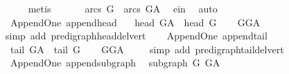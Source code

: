 \begin{isabellebody}
\ \ \ \ \isamarkupfalse%
\ metis\ \isanewline
\ \ \isamarkupfalse%
\ \isamarkupfalse%
\ {\isachardoublequoteopen}arcs\ G\ {\isasymnoteq}\ arcs\ G{\isacharunderscore}{\kern0pt}A{\isachardoublequoteclose}\ \isamarkupfalse%
\ e{\isacharunderscore}{\kern0pt}in\ \isamarkupfalse%
\ auto\isanewline
{}\isamarkupfalse%
%
\endisatagproof
{\isafoldproof}%
%
\isadelimproof
\isanewline
%
\endisadelimproof
\ \ \isanewline
{}\isamarkupfalse%
\ {\isacharparenleft}{\kern0pt}\ Append{\isacharunderscore}{\kern0pt}One{\isacharparenright}{\kern0pt}\ append{\isacharunderscore}{\kern0pt}head{\isacharcolon}{\kern0pt}\ \isanewline
\ \ {\isachardoublequoteopen}head\ G{\isacharunderscore}{\kern0pt}A\ {\isacharequal}{\kern0pt}\ head\ G{\isachardoublequoteclose}\isanewline
%
\isadelimproof
\ \ %
\endisadelimproof
%
\isatagproof
{}\isamarkupfalse%
\ GG{\isacharunderscore}{\kern0pt}A\ \isanewline
\ \ \isamarkupfalse%
\ {\isacharparenleft}{\kern0pt}simp\ add{\isacharcolon}{\kern0pt}\ pre{\isacharunderscore}{\kern0pt}digraph{\isachardot}{\kern0pt}head{\isacharunderscore}{\kern0pt}del{\isacharunderscore}{\kern0pt}vert{\isacharparenright}{\kern0pt}%
\endisatagproof
{\isafoldproof}%
%
\isadelimproof
\ \isanewline
%
\endisadelimproof
\isanewline
{}\isamarkupfalse%
\ {\isacharparenleft}{\kern0pt}\ Append{\isacharunderscore}{\kern0pt}One{\isacharparenright}{\kern0pt}\ append{\isacharunderscore}{\kern0pt}tail{\isacharcolon}{\kern0pt}\ \isanewline
\ \ {\isachardoublequoteopen}tail\ G{\isacharunderscore}{\kern0pt}A\ {\isacharequal}{\kern0pt}\ tail\ G{\isachardoublequoteclose}\isanewline
%
\isadelimproof
\ \ %
\endisadelimproof
%
\isatagproof
{}\isamarkupfalse%
\ GG{\isacharunderscore}{\kern0pt}A\ \isanewline
\ \ \isamarkupfalse%
\ {\isacharparenleft}{\kern0pt}simp\ add{\isacharcolon}{\kern0pt}\ pre{\isacharunderscore}{\kern0pt}digraph{\isachardot}{\kern0pt}tail{\isacharunderscore}{\kern0pt}del{\isacharunderscore}{\kern0pt}vert{\isacharparenright}{\kern0pt}%
\endisatagproof
{\isafoldproof}%
%
\isadelimproof
\ \isanewline
%
\endisadelimproof
\isanewline
{}\isamarkupfalse%
\ {\isacharparenleft}{\kern0pt}\ Append{\isacharunderscore}{\kern0pt}One{\isacharparenright}{\kern0pt}\ append{\isacharunderscore}{\kern0pt}subgraph{\isacharcolon}{\kern0pt}\ \isanewline
\ {\isachardoublequoteopen}subgraph\ G\ G{\isacharunderscore}{\kern0pt}A\ {\isachardoublequoteclose}\ \isanewline

\end{isabellebody}
